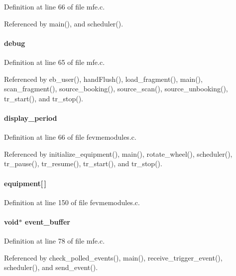 Definition at line 66 of file mfe.c.

Referenced by main(), and scheduler().
\paragraph[{debug}]{ {\bf debug}}\hfill\label{mfe_8c_a81f0a890e023743f1b88d0cb7d4f74db}


Definition at line 65 of file mfe.c.

Referenced by eb\_\-user(), handFlush(), load\_\-fragment(), main(), scan\_\-fragment(), source\_\-booking(), source\_\-scan(), source\_\-unbooking(), tr\_\-start(), and tr\_\-stop().
\paragraph[{display\_\-period}]{ {\bf display\_\-period}}\hfill\label{mfe_8c_ab9cdcefda91459091b0ed33011d0d18c}


Definition at line 66 of file fevmemodules.c.

Referenced by initialize\_\-equipment(), main(), rotate\_\-wheel(), scheduler(), tr\_\-pause(), tr\_\-resume(), tr\_\-start(), and tr\_\-stop().
\paragraph[{equipment}]{ {\bf equipment}\mbox{[}$\,$\mbox{]}}\hfill\label{mfe_8c_aa86ef8764826784b74603ffb23852283}


Definition at line 150 of file fevmemodules.c.
\paragraph[{event\_\-buffer}]{\setlength{\rightskip}{0pt plus 5cm}void$\ast$ {\bf event\_\-buffer}}\hfill\label{mfe_8c_ac755035b7fe3f9e7e9c0b9ba691fdf7e}


Definition at line 78 of file mfe.c.

Referenced by check\_\-polled\_\-events(), main(), receive\_\-trigger\_\-event(), scheduler(), and send\_\-event().
